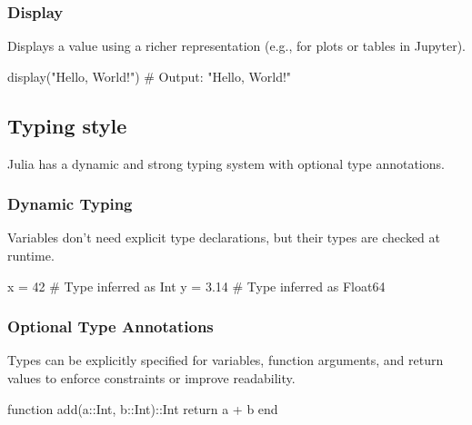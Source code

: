 \documentclass{report}
\begin{document}
    \subsubsection{Display}
    \bigbreak \noindent 
    Displays a value using a richer representation (e.g., for plots or tables in Jupyter).
    \bigbreak \noindent 
    \begin{jlcode}
    display("Hello, World!")  # Output: "Hello, World!"
    \end{jlcode}

    \pagebreak 
    \bigbreak \noindent 
    \subsection{Typing style}
    \bigbreak \noindent 
    Julia has a dynamic and strong typing system with optional type annotations.
    \bigbreak \noindent 
    \subsubsection{Dynamic Typing}
    \bigbreak \noindent 
    Variables don’t need explicit type declarations, but their types are checked at runtime.
    \bigbreak \noindent 
    \begin{jlcode}
        x = 42       # Type inferred as Int
        y = 3.14     # Type inferred as Float64
    \end{jlcode}
    \bigbreak \noindent 
    \subsubsection{Optional Type Annotations}
    \bigbreak \noindent 
     Types can be explicitly specified for variables, function arguments, and return values to enforce constraints or improve readability.
     \bigbreak \noindent 
     \begin{jlcode}
         function add(a::Int, b::Int)::Int
             return a + b
         end
     \end{jlcode}

     \bigbreak \noindent 
\end{document}
